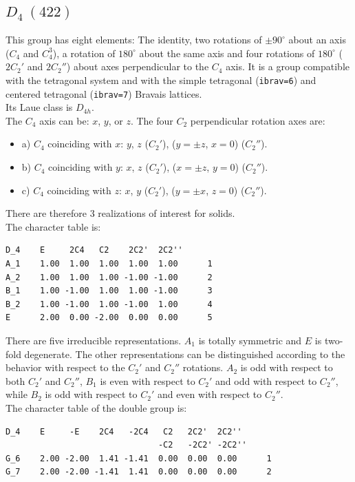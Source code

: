 \documentclass[12pt,a4paper]{article}
\begin{document}
\subsection{\color{web-blue}$D_4\ (422)$} 
This group has eight elements: The identity, two rotations of 
$\pm90^\circ$ about
an axis ($C_4$ and $C_4^3$), a rotation of $180^\circ$ about the same axis and
four rotations of $180^\circ$ ($2C_2'$ and $2C_2''$) about axes perpendicular 
to the $C_4$ axis. It is a group compatible with the tetragonal system and with the
simple tetragonal (\texttt{ibrav=6}) and centered tetragonal (\texttt{ibrav=7})
Bravais lattices. \\ 
Its Laue class is $D_{4h}$. \\
The $C_4$ axis can be: $x$, $y$, or $z$. The four $C_2$ perpendicular rotation
axes are: 
\begin{itemize}
\item
a) $C_4$ coinciding with $x$: $y$, $z$ ($C_2'$), ($y=\pm z$, $x=0$) ($C_2''$).
\item
b) $C_4$ coinciding with $y$: $x$, $z$ ($C_2'$), ($x=\pm z$, $y=0$) ($C_2''$).
\item
c) $C_4$ coinciding with $z$: $x$, $y$ ($C_2'$), ($y=\pm x$, $z=0$) ($C_2''$).
\end{itemize}
There are therefore $3$ realizations of interest for solids. \\
The character table is:
\begin{verbatim}
D_4    E     2C4   C2    2C2'  2C2''
A_1    1.00  1.00  1.00  1.00  1.00      1
A_2    1.00  1.00  1.00 -1.00 -1.00      2
B_1    1.00 -1.00  1.00  1.00 -1.00      3
B_2    1.00 -1.00  1.00 -1.00  1.00      4
E      2.00  0.00 -2.00  0.00  0.00      5
\end{verbatim}
There are five irreducible representations. $A_1$ is totally symmetric 
and $E$ is two-fold degenerate. The other representations can be distinguished
according to the behavior with respect to the $C_2'$ and $C_2''$ rotations.
$A_2$ is odd with respect to both $C_2'$ and $C_2''$, $B_1$ is even with respect
to $C_2'$ and odd with respect to $C_2''$, while $B_2$ is odd with respect to
$C_2'$ and even with respect to $C_2''$. \\ 
The character table of the double group is:
\begin{verbatim}
D_4    E     -E    2C4   -2C4   C2   2C2'  2C2''
                               -C2   -2C2' -2C2''
G_6    2.00 -2.00  1.41 -1.41  0.00  0.00  0.00      1
G_7    2.00 -2.00 -1.41  1.41  0.00  0.00  0.00      2
\end{verbatim}
\end{document}
